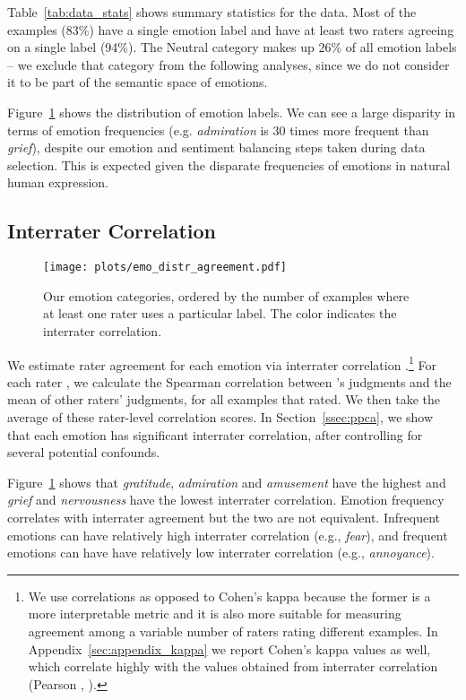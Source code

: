 \documentclass[11pt,a4paper]{article}
\begin{document}
Table~\ref{tab:data_stats} shows summary statistics for the data. Most of the examples (83\%) have a single emotion label and have at least two raters agreeing on a single label (94\%). The Neutral category makes up 26\% of all emotion labels -- we exclude that category from the following analyses, since we do not consider it to be part of the semantic space of emotions.

Figure~\ref{fig:emo_distr} shows the distribution of emotion labels. We can see a large disparity in terms of emotion frequencies (e.g. \emph{admiration} is 30 times more frequent than \emph{grief}), despite our emotion and sentiment balancing steps taken during data selection. This is expected given the disparate frequencies of emotions in natural human expression.


\subsection{Interrater Correlation}
\label{ssec:interrater_corr}


\begin{figure}[t!]
 \centering
   \centering
   \texttt{[image: plots/emo\_distr\_agreement.pdf]}
   \caption{Our emotion categories, ordered by the number of examples where at least one rater uses a particular label. The color indicates the interrater correlation.}
   \label{fig:emo_distr}
\end{figure}

We estimate rater agreement for each emotion via interrater correlation \citep{delgado2019cohen}.\footnote{We use correlations as opposed to Cohen's kappa \cite{cohen1960coefficient} because the former is a more interpretable metric and it is also more suitable for measuring agreement among a variable number of raters rating different examples. In Appendix~\ref{sec:appendix_kappa} we report Cohen's kappa values as well, which correlate highly with the values obtained from interrater correlation (Pearson , ).} For each rater , we calculate the Spearman correlation between 's judgments and the mean of other raters' judgments, for all examples that  rated. We then take the average of these rater-level correlation scores. In Section~\ref{ssec:ppca}, we show that each emotion has significant interrater correlation, after controlling for several potential confounds.

Figure~\ref{fig:emo_distr} shows that \emph{gratitude}, \emph{admiration} and \emph{amusement} have the highest and \emph{grief} and \emph{nervousness} have the lowest interrater correlation. Emotion frequency correlates with interrater agreement but the two are not equivalent. Infrequent emotions can have relatively high interrater correlation (e.g., \emph{fear}), and frequent emotions can have have relatively low interrater correlation (e.g., \emph{annoyance}).
\end{document}
